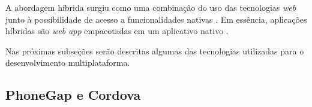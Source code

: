 A abordagem híbrida surgiu como uma combinação do uso das tecnologias \textit{web} junto à possibilidade de acesso a funcionalidades nativas \cite{heitkotter_evaluating_2013}.
Em essência, aplicações híbridas são \textit{web app} empacotadas em um aplicativo nativo \cite{stark_building_2010}.

\begin{comment}


Dentro da Engenharia de \textit{Software}, existe uma corrente que defende a criação de \textit{software} como uma Linha de Produtos (\textit{SPL}). 
No contexto de desenvolvimento, linha de produtos significa a criação de vários sistemas de \textit{software} a partir de um cojunto semelhante de requisitos,
cada novo sistema possui um conjunto distinto de requisitos que os diferencia dos demais, no entanto, todos os sistemas devem possui uma mesma linha de mercado
como educação ou aviação, por exemplo.

Linha de Produto de Software é um conjunto de sistemas de software que compartilham
um conjunto comum e gerenciado de características satisfazendo as necessidades específicas
de um segmento de mercado ou missão particular e que são desenvolvidos a partir de um
conjunto comum de artefatos de uma forma prescrita

um conjunto de aplicações
similares de um domínio, que podem ser desenvolvidas a partir de uma arquitetura genérica
comum, a arquitetura da LPS, e um conjunto de componentes que povoam a arquitetura

Com isso, a finalidade de uma linha de produto de software é diminuir os esforços de
engenharia necessários para construir aplicativos customizáveis e extensíveis de forma sis-
temática, a partir de artefatos gerenciáveis e reutilizáveis, aproveitando a semelhança entre
os sistemas e a capacidade de gestão de variações existentes entre os mesmos

...É possível fazer uma correlação com o desenvolvimento de aplicativos multiplataforma...
    
\end{comment} 

Nas próximas subseções serão descritas algumas das tecnologias utilizadas para o desenvolvimento multiplataforma.

\subsection{PhoneGap e Cordova} \label{subsection:phonegap}

